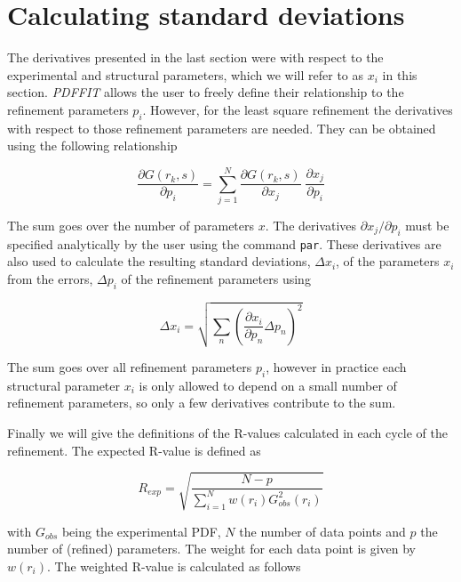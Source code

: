 
\section{Calculating standard deviations}

The derivatives presented in the last section were with respect to the
experimental and structural parameters, which we will refer to as
$x_{i}$ in this section. {\it PDFFIT} allows the user
to freely define their relationship to the refinement parameters
$p_{i}$. However, for the least square refinement the derivatives with
respect to those refinement parameters are needed. They can be obtained
using the following relationship

\begin{equation}
  \frac{\partial G(r_{k},s)}{\partial p_{i}} =
    \sum_{j=1}^{N} \frac{\partial G(r_{k},s)}{\partial x_{j}} \;
                   \frac{\partial x_{j}}     {\partial p_{i}}
\end{equation}

The sum goes over the number of parameters $x$. The derivatives
$\partial x_{j} / \partial p_{i}$ must be specified analytically by
the user using the command {\tt par}. These derivatives are also
used to calculate the resulting standard deviations, $\Delta x_{i}$,
of the parameters $x_{i}$ from the errors, $\Delta p_{i}$ of the
refinement parameters using

\begin{equation}
  \Delta x_{i} = \sqrt {\sum_{n} \left (
    \frac{\partial x_{i}}{\partial p_{n}} \Delta p_{n} \right ) ^{2}}
\end{equation}

The sum goes over all refinement parameters $p_{i}$, however in practice
each structural parameter $x_{i}$ is only allowed to depend on a small
number of refinement parameters, so only a few derivatives contribute
to the sum. \par

Finally we will give the definitions of the R-values calculated in
each cycle of the refinement. The expected R-value is defined as

\begin{equation}
  R_{exp} = \sqrt {\frac{ N - p}
                  {\sum\limits_{i=1}^{N} w(r_{i}) G_{obs}^{2}(r_{i})}}
  \label{eq_rexp}
\end{equation}

\noindent
with $G_{obs}$ being the experimental PDF, $N$ the number of data
points and $p$ the number of (refined) parameters. The weight for
each data point is given by $w(r_{i})$. The weighted R-value is calculated
as follows

